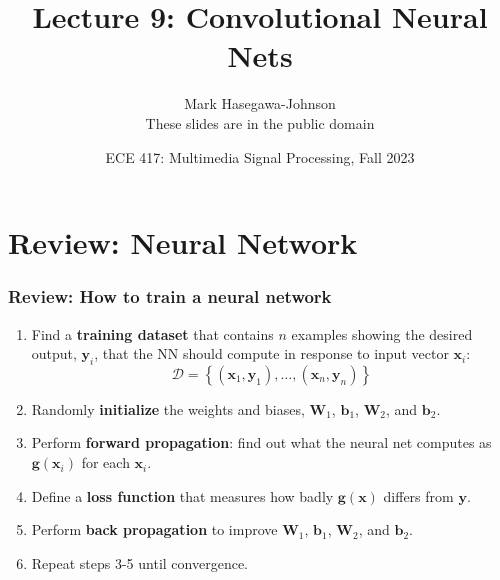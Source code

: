 \documentclass{beamer}
\title{Lecture 9: Convolutional Neural Nets}
\author{Mark Hasegawa-Johnson\\These slides are in the public domain}
\date{ECE 417: Multimedia Signal Processing, Fall 2023}
\begin{document}
\begin{frame}
  \maketitle
\end{frame}

\begin{frame}
  \tableofcontents
\end{frame}


\section[Review]{Review: Neural Network}
\setcounter{subsection}{1}

\begin{frame}
  \frametitle{Review: How to train a neural network}
  \begin{enumerate}
  \item Find a {\bf training dataset} that contains $n$ examples showing the
    desired output, $\mathbf{y}_i$, that the NN should compute in
    response to input vector $\mathbf{x}_i$:
    \[
    {\mathcal D}=\left\{(\mathbf{x}_1,\mathbf{y}_1),\ldots,(\mathbf{x}_n,\mathbf{y}_n)\right\}
    \]
    \item Randomly {\bf initialize} the weights and biases, $\mathbf{W}_{1}$,
      $\mathbf{b}_{1}$, $\mathbf{W}_{2}$, and $\mathbf{b}_{2}$.
    \item Perform {\bf forward propagation}: find out what the neural
      net computes as $\mathbf{g}(\mathbf{x}_i)$ for each $\mathbf{x}_i$.
    \item Define a {\bf loss function} that measures
      how badly $\mathbf{g}(\mathbf{x})$ differs from $\mathbf{y}$.
    \item Perform {\bf back propagation} to improve $\mathbf{W}_{1}$,
      $\mathbf{b}_{1}$, $\mathbf{W}_{2}$, and $\mathbf{b}_{2}$.
    \item Repeat steps 3-5 until convergence.
  \end{enumerate}
\end{frame}
\end{document}

